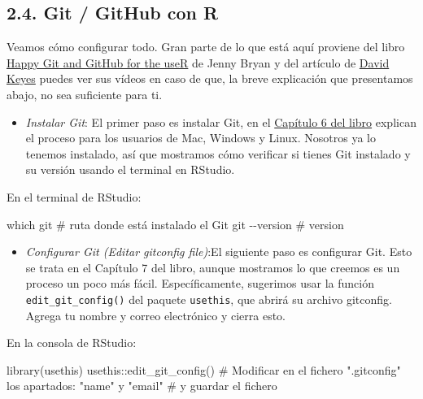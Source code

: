 \documentclass[
  letterpaper,
  DIV=11,
  numbers=noendperiod]{scrreprt}
\newenvironment{Shaded}{\begin{snugshade}}{\end{snugshade}}
\newcommand{\CommentTok}[1]{\textcolor[rgb]{0.37,0.37,0.37}{#1}}
\newcommand{\FunctionTok}[1]{\textcolor[rgb]{0.28,0.35,0.67}{#1}}
\newcommand{\NormalTok}[1]{\textcolor[rgb]{0.00,0.23,0.31}{#1}}
\newcommand{\SpecialCharTok}[1]{\textcolor[rgb]{0.37,0.37,0.37}{#1}}
\providecommand{\tightlist}{%
  \setlength{\itemsep}{0pt}\setlength{\parskip}{0pt}}\usepackage{longtable,booktabs,array}
\begin{document}
\hypertarget{git-github-con-r}{%
\subsection{2.4. Git / GitHub con R}\label{git-github-con-r}}

Veamos cómo configurar todo. Gran parte de lo que está aquí proviene del
libro \href{https://happygitwithr.com/}{Happy Git and GitHub for the
useR} de Jenny Bryan y del artículo de
\href{https://rfortherestofus.com/2021/02/how-to-use-git-github-with-r/}{David
Keyes} puedes ver sus vídeos en caso de que, la breve explicación que
presentamos abajo, no sea suficiente para ti.

\begin{itemize}
\tightlist
\item
  {\emph{Instalar Git}}: El primer paso es instalar Git, en el
  \href{https://happygitwithr.com/install-git}{Capítulo 6 del libro}
  explican el proceso para los usuarios de Mac, Windows y Linux.
  Nosotros ya lo tenemos instalado, así que mostramos cómo verificar si
  tienes Git instalado y su versión usando el terminal en RStudio.
\end{itemize}

En el terminal de RStudio:

\begin{Shaded}
\begin{Highlighting}[]
\NormalTok{which git }\CommentTok{\# ruta donde está instalado el Git}
\NormalTok{git }\SpecialCharTok{{-}{-}}\NormalTok{version }\CommentTok{\# version}
\end{Highlighting}
\end{Shaded}

\begin{itemize}
\tightlist
\item
  {\emph{Configurar Git (Editar gitconfig file)}}:El siguiente paso es
  configurar Git. Esto se trata en el Capítulo 7 del libro, aunque
  mostramos lo que creemos es un proceso un poco más fácil.
  Específicamente, sugerimos usar la función
  \texttt{edit\_git\_config()} del paquete \texttt{usethis}, que abrirá
  su archivo gitconfig. Agrega tu nombre y correo electrónico y cierra
  esto.
\end{itemize}

En la consola de RStudio:

\begin{Shaded}
\begin{Highlighting}[]
\FunctionTok{library}\NormalTok{(usethis)}
\NormalTok{usethis}\SpecialCharTok{::}\FunctionTok{edit\_git\_config}\NormalTok{()}
\CommentTok{\# Modificar en el fichero ".gitconfig" los apartados: "name" y "email" }
\CommentTok{\# y guardar el fichero}
\end{Highlighting}
\end{Shaded}
\end{document}
